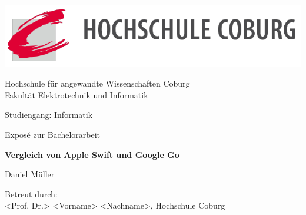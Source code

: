\begin{titlepage}
    \begin{center}
    \includegraphics[width=\textwidth]{Images/logo}
        \begin{Large}
        Hochschule für angewandte Wissenschaften Coburg
        \\
        Fakultät Elektrotechnik und Informatik
        \par
        \end{Large}
        \vspace{2.0cm}
        
        \begin{Large}
            Studiengang: Informatik
            \par
        \end{Large}
        \vspace{1.5cm}
        
        \begin{Large}
            Exposé zur Bachelorarbeit
        \end{Large}
        \vspace{2.0cm}

        \begin{huge}
            \textbf{Vergleich von Apple Swift und Google Go} 
            \par
        \end{huge}        
        \vfill
        
        \begin{huge}
            Daniel Müller
        \end{huge}
        \vspace{2.0cm}
        
        \begin{large}
            
            Betreut durch:
            \\
            <Prof. Dr.> <Vorname> <Nachname>, Hochschule Coburg
            \\
            \par
        \end{large}
        
    \end{center}
\end{titlepage}
\restoregeometry